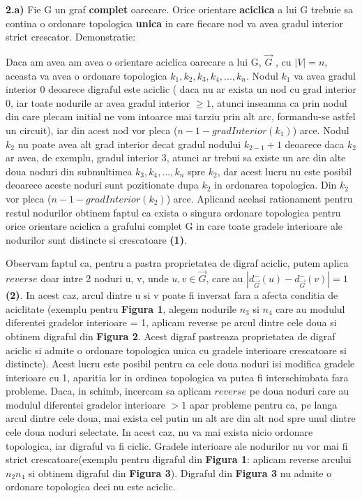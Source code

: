 \documentclass{article}
\begin{document}
 \par\textbf{2.a)} Fie G un graf \textbf{complet} oarecare. Orice orientare \textbf{aciclica} a lui G trebuie sa contina o ordonare topologica \textbf{unica} in care fiecare nod va avea gradul interior strict crescator. Demonstratie: \\
 \par Daca am avea am avea o orientare aciclica oarecare a lui G, $\vec{G}$ , cu $|V| =n$, aceasta va avea o ordonare topologica $k_{1},k_{2},k_{3},k_{4},...,k_{n}$. Nodul $k_{1}$ va avea gradul interior 0 deoarece digraful este aciclic ( daca nu ar exista un nod cu grad interior 0, iar toate nodurile ar avea gradul interior $\geq1$, atunci inseamna ca prin nodul din care plecam initial ne vom intoarce mai tarziu prin alt arc, formandu-se astfel un circuit), iar din acest nod vor pleca ($n-1-gradInterior(k_{1})$) arce. Nodul $k_{2}$ nu poate avea alt grad interior decat gradul nodului $k_{2-1} + 1$ deoarece daca $k_{2}$ ar avea, de exemplu, gradul interior 3, atunci ar trebui sa existe un arc din alte doua noduri din submultimea {$k_{3},k_{4},...,k_{n}$} spre $k_{2}$, dar acest lucru nu este posibil deoarece aceste noduri sunt pozitionate dupa $k_{2}$ in ordonarea topologica. Din $k_{2}$ vor pleca ($n-1-gradInterior(k_{2})$) arce. Aplicand acelasi rationament pentru restul nodurilor obtinem faptul ca exista o singura ordonare topologica pentru orice orientare aciclica a grafului complet G in care toate gradele interioare ale nodurilor sunt distincte si crescatoare \textbf{(1)}.
 \par Observam faptul ca, pentru a pastra proprietatea de digraf aciclic, putem aplica $reverse$ doar intre 2 noduri u, v, unde $u,v\in \vec{G}$, care au $|d^{-}_{\vec{G}}(u)-d^{-}_{\vec{G}}(v)|=1$ \textbf{(2)}. In acest caz, arcul dintre u si v poate fi inversat fara a afecta conditia de aciclitate (exemplu pentru \textbf{Figura 1}, alegem nodurile $n_{3}$ si $n_{4}$ care au modulul diferentei gradelor interioare = 1, aplicam reverse pe arcul dintre cele doua si obtinem digraful din \textbf{Figura 2}. Acest digraf pastreaza proprietatea de digraf aciclic si admite o ordonare topologica unica cu gradele interioare crescatoare si distincte). Acest lucru este posibil pentru ca cele doua noduri isi modifica gradele interioare cu 1, aparitia lor in ordinea topologica va putea fi interschimbata fara probleme. Daca, in schimb, incercam sa aplicam $reverse$ pe doua noduri care au modulul diferentei gradelor interioare $>1$ apar probleme pentru ca, pe langa arcul dintre cele doua, mai exista cel putin un alt arc din alt nod spre unul dintre cele doua noduri selectate. In acest caz, nu va mai exista nicio ordonare topologica, iar digraful va fi ciclic. Gradele interioare ale nodurilor nu vor mai fi strict crescatoare(exemplu pentru digraful din \textbf{Figura 1}: aplicam reverse arcului $n_{2}n_{4}$ si obtinem digraful din \textbf{Figura 3}). Digraful din \textbf{Figura 3} nu admite o ordonare topologica deci nu este aciclic.
\end{document}
